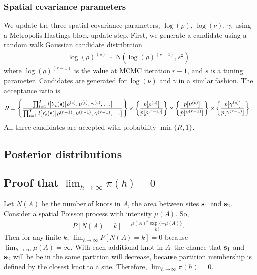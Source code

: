 \documentclass[11pt]{article}
\begin{document}
\subsubsection*{Spatial covariance parameters}
We update the three spatial covariance parameters, $\log(\rho)$, $\log(\nu)$, $\gamma$, using a Metropolis Hastings block update step.
First, we generate a candidate using a random walk Gaussian candidate distribution
\begin{align*}
	\log(\rho)^{(c)} \sim \text{N}(\log(\rho)^{(r - 1)}, s^2)
\end{align*}
where $\log(\rho)^{(r-1)}$ is the value at MCMC iteration $r - 1$, and $s$ is a tuning parameter.
Candidates are generated for $\log(\nu)$ and $\gamma$ in a similar fashion.
The acceptance ratio is
\begin{align*}
	R = \left\{ \frac{ \prod_{t = 1}^{T} l[Y_t(\mbox{\bf s}) | \rho^{(c)}, \nu^{(c)}, \gamma^{(c)}, \ldots] }{\prod_{t = 1}^{T} l[Y_t(\mbox{\bf s}) | \rho^{(r-1)}, \nu^{(r-1)}, \gamma^{(r-1)}, \ldots] } \right\} \times \left\{ \frac{ p[\rho^{(c)}] }{ p[\rho^{(r - 1)] } } \right\} \times \left\{ \frac{ p[\nu^{(c)}] }{ p[\nu^{(r - 1)}] } \right\} \times \left\{ \frac{ p[ \gamma^{(c)} ] }{ p[\gamma^{(r - 1)} ] } \right\}.
\end{align*}
All three candidates are accepted with probability $\min\{R, 1\}$.

\subsection{Posterior distributions} \label{a:posterior}





\subsection{Proof that $\lim_{h \rightarrow \infty} \pi(h) = 0$} \label{a:proofsamepartition}
Let $N(A)$ be the number of knots in $A$, the area between sites $\mbox{\bf s}_1$ and $\mbox{\bf s}_2$.
Consider a spatial Poisson process with intensity $\mu(A)$.
So,
\begin{align*}
  P[ N(A) = k] = \frac{ \mu(A)^k \exp\{ -\mu(A)\}}{k!}.
\end{align*}
Then for any finite $k$, $\lim_{h \rightarrow \infty} P[N(A) = k] = 0$ because $\lim_{h \rightarrow \infty} \mu(A) = \infty$.
With each additional knot in $A$, the chance that $\mbox{\bf s}_1$ and $\mbox{\bf s}_2$ will be be in the same partition will decrease, because partition membership is defined by the closest knot to a site.
Therefore, $\lim_{h \rightarrow \infty} \pi(h) = 0$.
\end{document}
